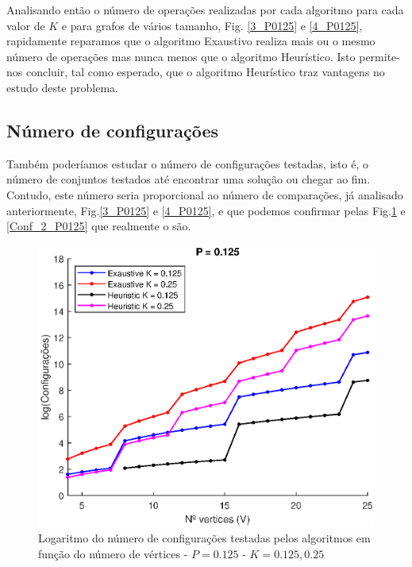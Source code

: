 \documentclass{revdetua}
\begin{document}
Analisando então o número de operações realizadas por cada algoritmo para cada valor de $K$ e para grafos de vários tamanho, Fig. \ref{3_P0125} e \ref{4_P0125}, rapidamente reparamos que o algoritmo Exaustivo realiza mais ou o mesmo número de operações mas nunca menos que o algoritmo Heurístico. Isto permite-nos concluir, tal como esperado, que o algoritmo Heurístico traz vantagens no estudo deste problema.


\subsection{Número de configurações}

Também poderíamos estudar o número de configurações testadas, isto é, o número de conjuntos testados até encontrar uma solução ou chegar ao fim. Contudo, este número seria proporcional ao número de comparações, já analisado anteriormente, Fig.\ref{3_P0125} e \ref{4_P0125}, e que podemos confirmar pelas Fig.\ref{Conf_1_P0125} e \ref{Conf_2_P0125} que realmente o são.

\begin{figure}[h!]
\centering
\includegraphics[scale = 0.5]{Figs/Conf_1_P0125.eps}
\caption{Logaritmo do número de configurações testadas pelos algoritmos em função do número de vértices - $P = 0.125$ - $K = 0.125, 0.25$}
\label{Conf_1_P0125}
\end{figure}
\end{document}
